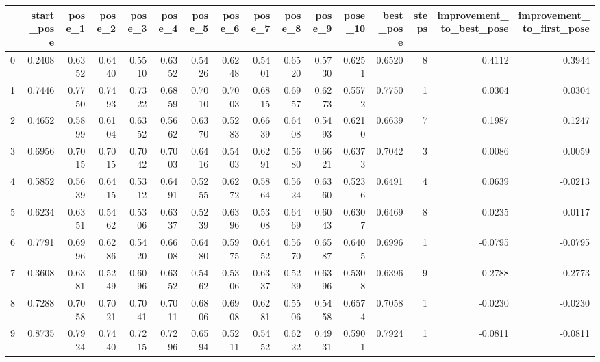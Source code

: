 \begin{tabular}{lrrrrrrrrrrrrrrr}
\toprule
{} &  start\_pose &  pose\_1 &  pose\_2 &  pose\_3 &  pose\_4 &  pose\_5 &  pose\_6 &  pose\_7 &  pose\_8 &  pose\_9 &  pose\_10 &  best\_pose &  steps &  improvement\_to\_best\_pose &  improvement\_to\_first\_pose \\
\midrule
0   &      0.2408 &  0.6352 &  0.6440 &  0.5510 &  0.6352 &  0.5426 &  0.6248 &  0.5401 &  0.6520 &  0.5730 &   0.6251 &     0.6520 &      8 &                    0.4112 &                     0.3944 \\
1   &      0.7446 &  0.7750 &  0.7493 &  0.7322 &  0.6859 &  0.7010 &  0.7003 &  0.6815 &  0.6957 &  0.6273 &   0.5572 &     0.7750 &      1 &                    0.0304 &                     0.0304 \\
2   &      0.4652 &  0.5899 &  0.6104 &  0.6352 &  0.5662 &  0.6370 &  0.5283 &  0.6639 &  0.6408 &  0.5493 &   0.6210 &     0.6639 &      7 &                    0.1987 &                     0.1247 \\
3   &      0.6956 &  0.7015 &  0.7015 &  0.7042 &  0.7003 &  0.6416 &  0.5403 &  0.6291 &  0.5680 &  0.6621 &   0.6373 &     0.7042 &      3 &                    0.0086 &                     0.0059 \\
4   &      0.5852 &  0.5639 &  0.6415 &  0.5312 &  0.6491 &  0.5255 &  0.6272 &  0.5864 &  0.5624 &  0.6360 &   0.5236 &     0.6491 &      4 &                    0.0639 &                    -0.0213 \\
5   &      0.6234 &  0.6351 &  0.5462 &  0.5306 &  0.6337 &  0.5239 &  0.6396 &  0.5308 &  0.6469 &  0.6043 &   0.6307 &     0.6469 &      8 &                    0.0235 &                     0.0117 \\
6   &      0.7791 &  0.6996 &  0.6286 &  0.5420 &  0.6608 &  0.6480 &  0.5975 &  0.6452 &  0.5670 &  0.6587 &   0.6405 &     0.6996 &      1 &                   -0.0795 &                    -0.0795 \\
7   &      0.3608 &  0.6381 &  0.5249 &  0.6096 &  0.6352 &  0.5462 &  0.5306 &  0.6337 &  0.5239 &  0.6396 &   0.5308 &     0.6396 &      9 &                    0.2788 &                     0.2773 \\
8   &      0.7288 &  0.7058 &  0.7021 &  0.7041 &  0.7011 &  0.6806 &  0.6908 &  0.6281 &  0.5506 &  0.5458 &   0.6574 &     0.7058 &      1 &                   -0.0230 &                    -0.0230 \\
9   &      0.8735 &  0.7924 &  0.7440 &  0.7215 &  0.7296 &  0.6594 &  0.5211 &  0.5452 &  0.6222 &  0.4931 &   0.5901 &     0.7924 &      1 &                   -0.0811 &                    -0.0811 \\

\end{tabular}
